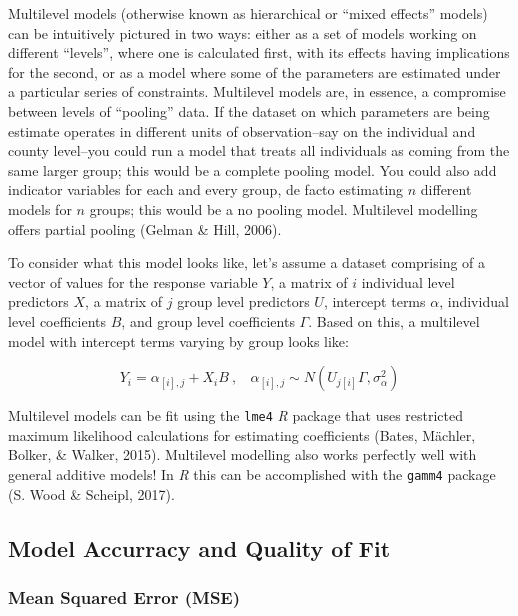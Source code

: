 \documentclass[12pt,twoside]{reedthesis}
\begin{document}
  Multilevel models (otherwise known as hierarchical or ``mixed effects''
  models) can be intuitively pictured in two ways: either as a set of
  models working on different ``levels'', where one is calculated first,
  with its effects having implications for the second, or as a model where
  some of the parameters are estimated under a particular series of
  constraints. Multilevel models are, in essence, a compromise between
  levels of ``pooling'' data. If the dataset on which parameters are being
  estimate operates in different units of observation--say on the
  individual and county level--you could run a model that treats all
  individuals as coming from the same larger group; this would be a
  complete pooling model. You could also add indicator variables for each
  and every group, de facto estimating \(n\) different models for \(n\)
  groups; this would be a no pooling model. Multilevel modelling offers
  partial pooling (Gelman \& Hill, 2006).
  
  To consider what this model looks like, let's assume a dataset
  comprising of a vector of values for the response variable \(Y\), a
  matrix of \(i\) individual level predictors \(X\), a matrix of \(j\)
  group level predictors \(U\), intercept terms \(\alpha\), individual
  level coefficients \(B\), and group level coefficients \(\Gamma\). Based
  on this, a multilevel model with intercept terms varying by group looks
  like:
  
  \[Y_i = \alpha_{[i], j} + X_iB~,~~~~\alpha_{[i], j} \sim N(U_{j[i]}\Gamma, \sigma_{\alpha}^2)\]
  
  Multilevel models can be fit using the \texttt{lme4} \textit{R} package
  that uses restricted maximum likelihood calculations for estimating
  coefficients (Bates, Mächler, Bolker, \& Walker, 2015). Multilevel
  modelling also works perfectly well with general additive models! In
  \textit{R} this can be accomplished with the \texttt{gamm4} package (S.
  Wood \& Scheipl, 2017).
  
  \subsection{Model Accurracy and Quality of
  Fit}\label{model-accurracy-and-quality-of-fit}
  
  \subsubsection{Mean Squared Error (MSE)}\label{mean-squared-error-mse}
  
\end{document}
